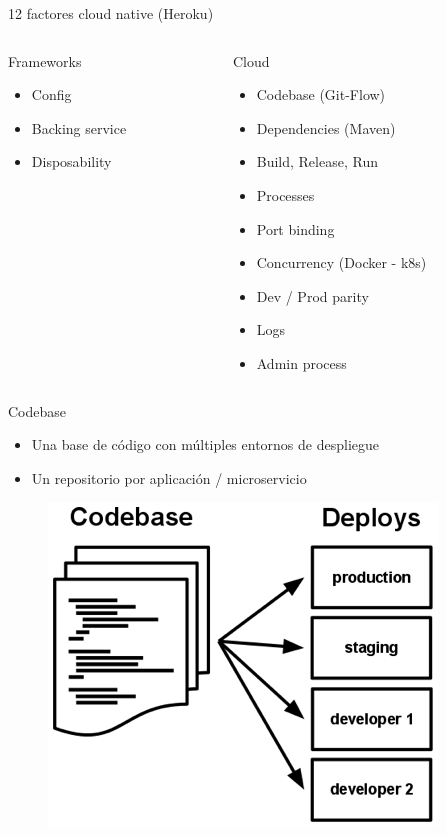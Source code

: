 \documentclass[aspectratio=169]{beamer}
\begin{document}
\begin{frame}{12 factores cloud native (Heroku)}

\begin{columns}[T] %

	\begin{column}[T]{4cm} %
		\begin{alertblock}{Frameworks}
			\begin{itemize}
				\item Config
				\item Backing service
				\item Disposability
			\end{itemize}
		\end{alertblock}
	\end{column}
	\begin{column}[T]{6cm} %
		\begin{block}{Cloud}
			\begin{itemize}
				\item Codebase (Git-Flow)
				\item Dependencies (Maven)
				\item Build, Release, Run
				\item Processes
				\item Port binding
				\item Concurrency (Docker - k8s)
				\item Dev / Prod parity
				\item Logs
				\item Admin process
			\end{itemize}
		\end{block}
	\end{column}
\end{columns}

\end{frame}

\begin{frame}{Codebase}
\begin{itemize}
	\item Una base de código con múltiples entornos de despliegue
	\item Un repositorio por aplicación / microservicio
\end{itemize}

\begin{figure}
	\centering
	\includegraphics[width=0.5\linewidth]{Images/121}
\end{figure}
\end{frame}
\end{document}

